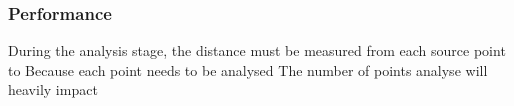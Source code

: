 \subsubsection{Performance}

During the analysis stage, the distance must be measured from each source point to 
Because each point needs to be analysed 
The number of points analyse will heavily impact